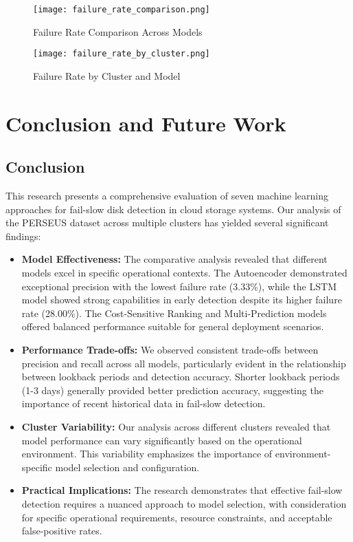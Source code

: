 \documentclass{article}
\begin{document}
\begin{figure}[!htb]
\centering
\texttt{[image: failure\_rate\_comparison.png]}
\caption{Failure Rate Comparison Across Models}
\label{fig:failure-rate-comparison}
\end{figure}

\clearpage \begin{figure}[!htb]
\centering
\texttt{[image: failure\_rate\_by\_cluster.png]}
\caption{Failure Rate by Cluster and Model}
\label{fig:failure-rate-by-cluster}
\end{figure}
 

\section{Conclusion and Future Work}

\subsection{Conclusion}
This research presents a comprehensive evaluation of seven machine learning approaches for fail-slow disk detection in cloud storage systems. Our analysis of the PERSEUS dataset across multiple clusters has yielded several significant findings:

\begin{itemize}
    \item \textbf{Model Effectiveness:} The comparative analysis revealed that different models excel in specific operational contexts. The Autoencoder demonstrated exceptional precision with the lowest failure rate (3.33\%), while the LSTM model showed strong capabilities in early detection despite its higher failure rate (28.00\%). The Cost-Sensitive Ranking and Multi-Prediction models offered balanced performance suitable for general deployment scenarios.

    \item \textbf{Performance Trade-offs:} We observed consistent trade-offs between precision and recall across all models, particularly evident in the relationship between lookback periods and detection accuracy. Shorter lookback periods (1-3 days) generally provided better prediction accuracy, suggesting the importance of recent historical data in fail-slow detection.

    \item \textbf{Cluster Variability:} Our analysis across different clusters revealed that model performance can vary significantly based on the operational environment. This variability emphasizes the importance of environment-specific model selection and configuration.

    \item \textbf{Practical Implications:} The research demonstrates that effective fail-slow detection requires a nuanced approach to model selection, with consideration for specific operational requirements, resource constraints, and acceptable false-positive rates.
\end{itemize}
\end{document}
